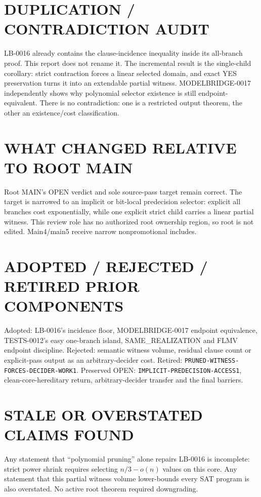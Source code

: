 \documentclass[11pt]{article}
\begin{document}
\section{DUPLICATION / CONTRADICTION AUDIT}

LB-0016 already contains the clause-incidence inequality inside its
all-branch proof.  This report does not rename it.  The incremental result is
the single-child corollary: strict contraction forces a linear selected
domain, and exact YES preservation turns it into an extendable partial
witness.  MODELBRIDGE-0017 independently shows why polynomial selector
existence is still endpoint-equivalent.  There is no contradiction: one is a
restricted output theorem, the other an existence/cost classification.

\section{WHAT CHANGED RELATIVE TO ROOT MAIN}

Root MAIN's OPEN verdict and sole source-pass target remain correct.  The
target is narrowed to an implicit or bit-local predecision selector: explicit
all branches cost exponentially, while one explicit strict child carries a
linear partial witness.  This review role has no authorized root ownership
region, so root  is not edited.  Main4/main5 receive narrow
nonpromotional includes.

\section{ADOPTED / REJECTED / RETIRED PRIOR COMPONENTS}

Adopted: LB-0016's incidence floor, MODELBRIDGE-0017 endpoint equivalence,
TESTS-0012's easy one-branch island, SAME\_REALIZATION and FLMV endpoint
discipline.  Rejected: semantic witness volume, residual clause count or
explicit-pass output as an arbitrary-decider cost.  Retired:
\texttt{PRUNED-WITNESS-FORCES-DECIDER-WORK1}.  Preserved OPEN:
\texttt{IMPLICIT-PREDECISION-ACCESS1}, clean-core-hereditary return,
arbitrary-decider transfer and the final barriers.

\section{STALE OR OVERSTATED CLAIMS FOUND}

Any statement that ``polynomial pruning'' alone repairs LB-0016 is incomplete:
strict power shrink requires selecting $n/3-o(n)$ values on this core.  Any
statement that this partial witness volume lower-bounds every SAT program is
also overstated.  No active root theorem required downgrading.
\end{document}
